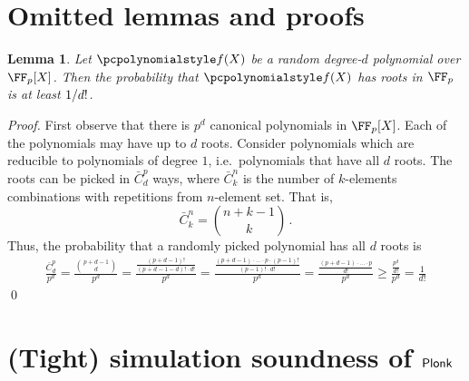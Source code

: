 \let\accentvec\vec \documentclass[runningheads,10pt]{llncs}
\newtheorem{lemma}[theorem]{Lemma}
\begin{document}
	\section{Omitted lemmas and proofs}
	\begin{lemma}
			\label{lem:root_prob}
			Let $\p{f}(X)$ be a random degree-$d$ polynomial over $\FF_p[X]$. Then
			the probability that $\p{f}(X)$ has roots in $\FF_p$ is at least
			$1 / d!$.
	\end{lemma}
	\begin{proof}
			First observe that there is $p^{d}$ canonical polynomials in $\FF_p[X]$.
			Each of the polynomials may have up to $d$ roots. Consider polynomials
			which are reducible to polynomials of degree $1$, i.e.~polynomials that
			have all $d$ roots. The roots can be picked in $\bar{C}^{p}_{d}$
			ways, where $\bar{C}^{n}_{k}$ is the number of
			$k$-elements combinations with 
			repetitions from $n$-element set. That is,
			\[
					\bar{C}^n_k = \binom{n + k - 1}{k}\,.
			\]
			Thus, the probability that a randomly picked polynomial has all $d$
			roots is 
			\begin{multline*}
					\frac{\bar{C}^p_d}{p^d} = \frac{\binom{p + d - 1}{d}}{p^d} =
					\frac{\frac{(p + d - 1)!}{(p + d - 1 - d)! \cdot d!}}{p^d} =
					\frac{\frac{(p + d - 1) \cdot \ldots \cdot p \cdot (p - 1)!}{(p -
					1)! \cdot d!}}{p^d} = \frac{\frac{(p + d - 1)\cdot \ldots \cdot
	p}{d!}}{p^d}
					 \geq \frac{\frac{p^d}{d!}}{p^d} = \frac{1}{d!}
			\end{multline*}
			\qed
	\end{proof}

	\section{(Tight) simulation soundness of $\textnormal{\textsf{Plonk}}$}
\end{document}
